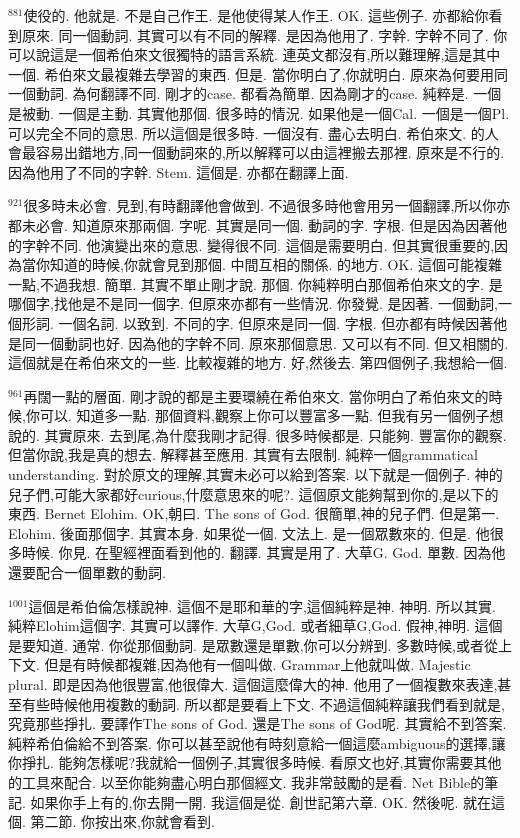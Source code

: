 \documentclass{book}
\begin{document}
$^{881}$使役的.
他就是.
不是自己作王.
是他使得某人作王.
OK.
這些例子.
亦都給你看到原來.
同一個動詞.
其實可以有不同的解釋.
是因為他用了.
字幹.
字幹不同了.
你可以說這是一個希伯來文很獨特的語言系統.
連英文都沒有,所以難理解,這是其中一個.
希伯來文最複雜去學習的東西.
但是.
當你明白了,你就明白.
原來為何要用同一個動詞.
為何翻譯不同.
剛才的case.
都看為簡單.
因為剛才的case.
純粹是.
一個是被動.
一個是主動.
其實他那個.
很多時的情況.
如果他是一個Cal.
一個是一個Pl.
可以完全不同的意思.
所以這個是很多時.
一個沒有.
盡心去明白.
希伯來文.
的人會最容易出錯地方,同一個動詞來的,所以解釋可以由這裡搬去那裡.
原來是不行的.
因為他用了不同的字幹.
Stem.
這個是.
亦都在翻譯上面.

$^{921}$很多時未必會.
見到,有時翻譯他會做到.
不過很多時他會用另一個翻譯,所以你亦都未必會.
知道原來那兩個.
字呢.
其實是同一個.
動詞的字.
字根.
但是因為因著他的字幹不同.
他演變出來的意思.
變得很不同.
這個是需要明白.
但其實很重要的,因為當你知道的時候,你就會見到那個.
中間互相的關係.
的地方.
OK.
這個可能複雜一點,不過我想.
簡單.
其實不單止剛才說.
那個.
你純粹明白那個希伯來文的字.
是哪個字,找他是不是同一個字.
但原來亦都有一些情況.
你發覺.
是因著.
一個動詞,一個形詞.
一個名詞.
以致到.
不同的字.
但原來是同一個.
字根.
但亦都有時候因著他是同一個動詞也好.
因為他的字幹不同.
原來那個意思.
又可以有不同.
但又相關的.
這個就是在希伯來文的一些.
比較複雜的地方.
好,然後去.
第四個例子,我想給一個.

$^{961}$再闊一點的層面.
剛才說的都是主要環繞在希伯來文.
當你明白了希伯來文的時候,你可以.
知道多一點.
那個資料,觀察上你可以豐富多一點.
但我有另一個例子想說的.
其實原來.
去到尾,為什麼我剛才記得.
很多時候都是.
只能夠.
豐富你的觀察.
但當你說,我是真的想去.
解釋甚至應用.
其實有去限制.
純粹一個grammatical understanding.
對於原文的理解,其實未必可以給到答案.
以下就是一個例子.
神的兒子們,可能大家都好curious,什麼意思來的呢?.
這個原文能夠幫到你的,是以下的東西.
Bernet Elohim.
OK,朝曰.
The sons of God.
很簡單,神的兒子們.
但是第一.
Elohim.
後面那個字.
其實本身.
如果從一個.
文法上.
是一個眾數來的.
但是.
他很多時候.
你見.
在聖經裡面看到他的.
翻譯.
其實是用了.
大草G.
God.
單數.
因為他還要配合一個單數的動詞.

$^{1001}$這個是希伯倫怎樣說神.
這個不是耶和華的字,這個純粹是神.
神明.
所以其實.
純粹Elohim這個字.
其實可以譯作.
大草G,God.
或者細草G,God.
假神,神明.
這個是要知道.
通常.
你從那個動詞.
是眾數還是單數,你可以分辨到.
多數時候,或者從上下文.
但是有時候都複雜,因為他有一個叫做.
Grammar上他就叫做.
Majestic plural.
即是因為他很豐富,他很偉大.
這個這麼偉大的神.
他用了一個複數來表達,甚至有些時候他用複數的動詞.
所以都是要看上下文.
不過這個純粹讓我們看到就是,究竟那些掙扎.
要譯作The sons of God.
還是The sons of God呢.
其實給不到答案.
純粹希伯倫給不到答案.
你可以甚至說他有時刻意給一個這麼ambiguous的選擇,讓你掙扎.
能夠怎樣呢?我就給一個例子,其實很多時候.
看原文也好,其實你需要其他的工具來配合.
以至你能夠盡心明白那個經文.
我非常鼓勵的是看.
Net Bible的筆記.
如果你手上有的,你去開一開.
我這個是從.
創世記第六章.
OK.
然後呢.
就在這個.
第二節.
你按出來,你就會看到.
\end{document}
